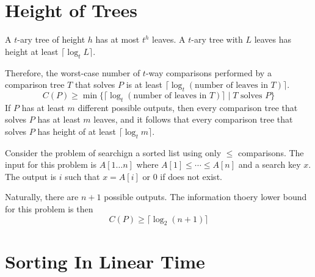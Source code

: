 \section{Height of Trees}

A $t$-ary tree of height $h$ has at most $t^h$ leaves. A $t$-ary tree with $L$ leaves has height at least $\lceil \log_t L \rceil$.

Therefore, the worst-case number of $t$-way comparisons performed by a comparison tree $T$ that solves $P$ is at least $\lceil \log_t (\text{number of leaves in $T$}) \rceil$.
$$
C(P) \geq \min \{ \lceil \log_t (\text{number of leaves in $T$}) \rceil \mid \text{$T$ solves $P$} \}
$$
If $P$ has at least $m$ different possible outputs, then every comparison tree that solves $P$ has at least $m$ leaves, and it follows that every comparison tree that solves $P$ has height of at least $\lceil \log_t m \rceil$.

\begin{example}
    Consider the problem of searchign a sorted list using only $\leq$ comparisons. The input for this problem is $A[1\ldots n]$ where $A[1] \leq \cdots \leq A[n]$ and a search key $x$. The output is $i$ such that $x=A[i]$ or 0 if does not exist.

    Naturally, there are $n+1$ possible outputs. The information thoery lower bound for this problem is then
    $$
    C(P) \geq \lceil \log_2 (n+1) \rceil
    $$
\end{example}

\section{Sorting In Linear Time}